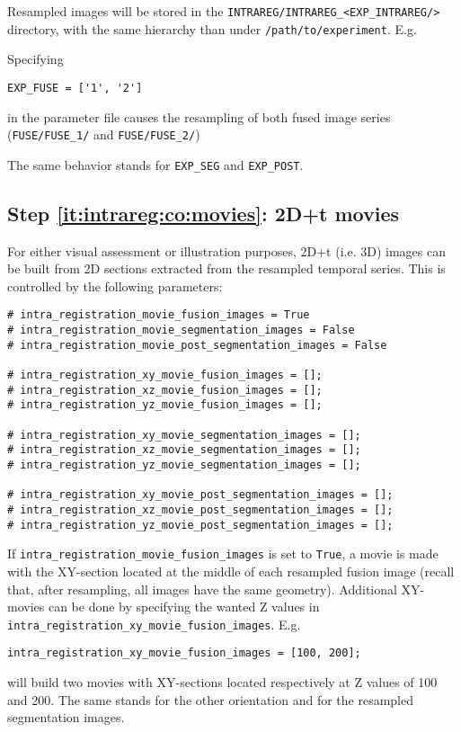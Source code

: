 Resampled images will be stored in the
\texttt{INTRAREG/INTRAREG\_<EXP\_INTRAREG/>} directory, with the same
hierarchy than under \texttt{/path/to/experiment}. E.g. 

\mbox{}
\mbox{}

Specifying
\begin{verbatim}
EXP_FUSE = ['1', '2']
\end{verbatim}
in the parameter file causes the resampling of both fused image series
(\texttt{FUSE/FUSE\_1/} and \texttt{FUSE/FUSE\_2/})

\mbox{}
\mbox{}

The same behavior stands for \texttt{EXP\_SEG} and  \texttt{EXP\_POST}.


\subsection{Step \ref{it:intrareg:co:movies}: 2D+t movies}
\label{sec:cli:intraregistration:movies}
For either visual assessment or illustration purposes, 2D+t (i.e. 3D) images can be built from 2D sections extracted from the resampled temporal series. This is controlled by the following parameters:
\begin{verbatim}
# intra_registration_movie_fusion_images = True
# intra_registration_movie_segmentation_images = False
# intra_registration_movie_post_segmentation_images = False

# intra_registration_xy_movie_fusion_images = [];
# intra_registration_xz_movie_fusion_images = [];
# intra_registration_yz_movie_fusion_images = [];

# intra_registration_xy_movie_segmentation_images = [];
# intra_registration_xz_movie_segmentation_images = [];
# intra_registration_yz_movie_segmentation_images = [];

# intra_registration_xy_movie_post_segmentation_images = [];
# intra_registration_xz_movie_post_segmentation_images = [];
# intra_registration_yz_movie_post_segmentation_images = [];
\end{verbatim}

If \verb|intra_registration_movie_fusion_images| is set to \verb|True|, a movie is made with the  XY-section located at the middle of each resampled fusion image (recall that, after resampling, all images have the same geometry). Additional XY-movies can be done by specifying the wanted Z values in \verb|intra_registration_xy_movie_fusion_images|. E.g.
\begin{verbatim}
intra_registration_xy_movie_fusion_images = [100, 200];
\end{verbatim}
will build two movies with XY-sections located respectively at Z values of 100 and 200. The same stands for the other orientation and for the resampled segmentation images.

